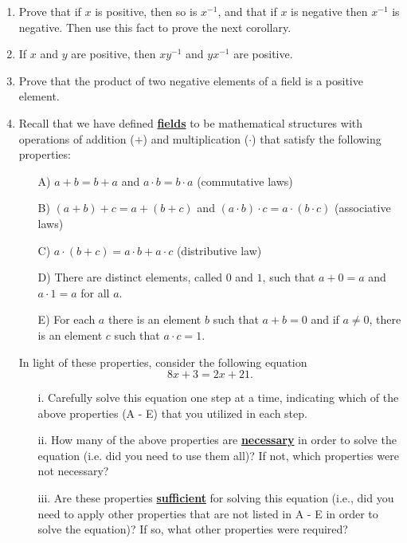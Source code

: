 \documentclass[11pt]{article}
\renewcommand\emph[1]{\underline{\bf{#1}}} %
\theoremstyle{definition}
\begin{document}
\begin{enumerate}

  \item Prove that if $x$ is positive, then so is $x^{-1}$, and that if $x$ is negative then $x^{-1}$ is negative. Then use this fact to prove the next corollary.

  \item If $x$ and $y$ are positive, then $xy^{-1}$ and $yx^{-1}$ are positive.

  \item Prove that the product of two negative elements of a field is a positive element.
  
\item   Recall that we have defined \emph{fields} to be mathematical structures with operations of addition ($+$) and multiplication ($\cdot$) that satisfy the following properties:
  \begin{itemize}
    \item[A)] $a+b=b+a$ and $a\cdot b=b\cdot a$ (commutative laws)
    \item[B)] $(a+b)+c = a + (b+c)$ and $(a\cdot b)\cdot c = a\cdot (b \cdot c)$ (associative laws)
    \item[C)] $a\cdot (b+c) = a\cdot b + a \cdot c$ (distributive law)
    \item[D)] There are distinct elements, called $0$ and $1$, such that $a+0 = a $ and $a \cdot 1 = a$ for all $a$.
    \item[E)] For each $a$ there is an element $b$ such that $a + b = 0$ and if $a\neq 0$, there is an element $c$ such that $a\cdot c = 1$.
  \end{itemize}
  In light of these properties, consider the following equation       
      \[8x+3=2x+21.\]
  \begin{itemize}
    \item[i.] Carefully solve this equation one step at a time, indicating which of the above properties (A - E) that you utilized in each step. 
    \item[ii.]How many of the above properties are \emph{necessary} in order to solve the equation (i.e. did you need to use them all)? If not, which properties were not necessary?
    \item[iii.] Are these properties \emph{sufficient} for solving this equation (i.e., did you need to apply other properties that are not listed in A - E in order to solve the equation)? If so, what other properties were required? 
  \end{itemize}
 
\end{enumerate}
\end{document}
